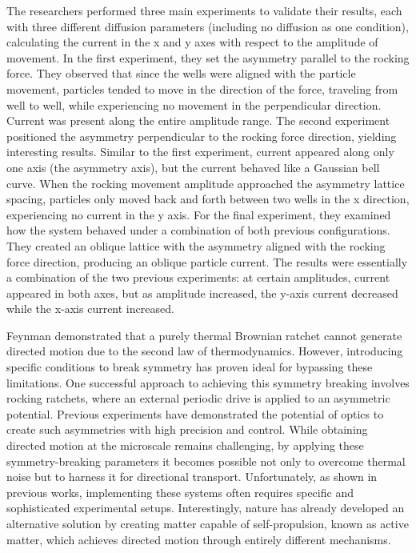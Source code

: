 The researchers performed three main experiments to validate their results, each with three different diffusion parameters (including no diffusion as one condition), calculating the current in the x and y axes with respect to the amplitude of movement. In the first experiment, they set the asymmetry parallel to the rocking force. They observed that since the wells were aligned with the particle movement, particles tended to move in the direction of the force, traveling from well to well, while experiencing no movement in the perpendicular direction. Current was present along the entire amplitude range.
The second experiment positioned the asymmetry perpendicular to the rocking force direction, yielding interesting results. Similar to the first experiment, current appeared along only one axis (the asymmetry axis), but the current behaved like a Gaussian bell curve. When the rocking movement amplitude approached the asymmetry lattice spacing, particles only moved back and forth between two wells in the x direction, experiencing no current in the y axis.
For the final experiment, they examined how the system behaved under a combination of both previous configurations. They created an oblique lattice with the asymmetry aligned with the rocking force direction, producing an oblique particle current. The results were essentially a combination of the two previous experiments: at certain amplitudes, current appeared in both axes, but as amplitude increased, the y-axis current decreased while the x-axis current increased. 


Feynman demonstrated that a purely thermal Brownian ratchet cannot generate directed motion due to the second law of thermodynamics. However, introducing specific conditions to break symmetry has proven ideal for bypassing these limitations.
One successful approach to achieving this symmetry breaking involves rocking ratchets, where an external periodic drive is applied to an asymmetric potential. Previous experiments have demonstrated the potential of optics to create such asymmetries with high precision and control. While obtaining directed motion at the microscale remains challenging, by applying these symmetry-breaking parameters it becomes possible not only to overcome thermal noise but to harness it for directional transport. Unfortunately, as shown in previous works, implementing these systems often requires specific and sophisticated experimental setups. Interestingly, nature has already developed an alternative solution by creating matter capable of self-propulsion, known as active matter, which achieves directed motion through entirely different mechanisms.




